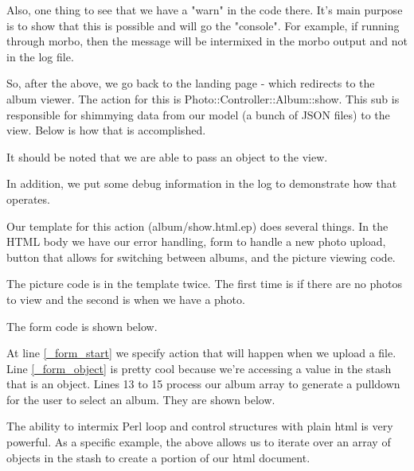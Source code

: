 \documentclass[14pt]{extreport}
\newcommand\Small{\fontsize{12}{13.0}\fontencoding{T1}\selectfont}
\newcommand*\LSTfont{\Small\ttfamily\SetTracking{encoding=*}{-60}\lsstyle}
\begin{document}


Also, one thing to see that we have a "warn" in the code there. It's main
purpose is to show that this is possible and will go the "console". For
example, if running through morbo, then the message will be intermixed in the 
morbo output and not in the log file.

So, after the above, we go back to the landing page - which redirects to the
album viewer.  The action for this is Photo::Controller::Album::show. This sub
is responsible for shimmying data from our model (a bunch of JSON files) to the
view.  Below is how that is accomplished.

It should be noted that we are able to pass an object to the view.



In addition, we put some debug information in the log to demonstrate how that
operates.



Our template for this action (album/show.html.ep) does several things. In the
HTML body we have our error handling, form to handle a new photo upload, button
that allows for switching between albums, and the picture viewing code.  

The picture code is in the template twice.  The first time is if there are no
photos to view and the second is when we have a photo.

The form code is shown below.



At line \ref{_form_start} we specify action that will happen when we upload a
file.  Line \ref{_form_object} is pretty cool because we're accessing a value in
the stash that is an object.  Lines 13 to 15 process our album array to
generate a pulldown for the user to select an album.  They are shown below.



The ability to intermix Perl loop and control structures with plain html is
very powerful. As a specific example, the above allows us to iterate over an 
array of objects in the stash to create a portion of our html document.
\end{document}
